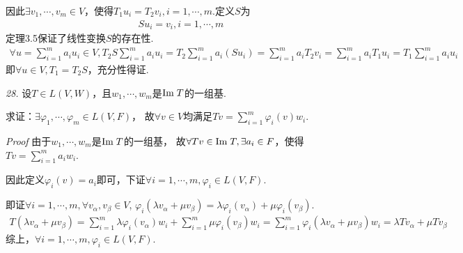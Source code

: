因此\(\exists v_1,\cdots,v_m \in V\)，使得\(T_1u_i=T_2v_i,i=1,\cdots,m\).定义\(S\)为
    \begin{align*}
        Su_i=v_i,i=1,\cdots,m
    \end{align*}
定理3.5保证了线性变换\(S\)的存在性.
    \begin{align*}
        \forall u=\sum_{i=1}^m a_iu_i \in V,T_2S\sum_{i=1}^m a_iu_i=T_2\sum_{i=1}^m a_i(Su_i)
        =\sum_{i=1}^m a_iT_2v_i=\sum_{i=1}^m a_iT_1u_i=T_1\sum_{i=1}^m a_iu_i
    \end{align*}
即\(\forall u \in V , T_1=T_2S\)，充分性得证.

\hspace*{\fill}

    \begin{comment}
        \textit{26.}
        设\(D \in L(P(R))\)对于其中任意的多项式\(p\)满足\(\mydeg Dp=\mydeg p-1\).

        求证：\(D\)是满射变换.

        \textit{Proof}
        根据\textit{3.B.10}，命题等价于
            \begin{align*}
                \myspan (D(x),D(x^2),\cdots)=\Img D=P(R)=\myspan (1,x,\cdots)
            \end{align*}
        根据\textit{2.C.10}，由于\(\mydeg Dp=\mydeg p-1\)，

        故\(\myspan (D(x),D(x^2),\cdots)=\myspan (1,x,\cdots)\)成立.
    \end{comment}

\textit{28.}
设\(T \in L(V,W)\)，且\(w_1,\cdots,w_m\)是\(\mathrm{Im \;} T\)的一组基.

求证：\(\exists \varphi_1,\cdots,\varphi_m \in L(V,F)\)，
故\(\forall v \in V\)均满足\(Tv=\sum_{i=1}^m{\varphi_i(v)w_i}\).

\textit{Proof}
由于\(w_1,\cdots,w_m\)是\(\mathrm{Im \;} T\)的一组基，
故\(\forall Tv \in \mathrm{Im \;} T,\exists a_i \in F\)，使得\(Tv=\sum_{i=1}^m a_iw_i\).

因此定义\(\varphi_i(v)=a_i\)即可，下证\(\forall i=1,\cdots,m,\varphi_i \in L(V,F)\).

即证\(\forall i=1,\cdots,m,\forall v_\alpha,v_\beta \in V\),
\(\varphi_i(\lambda v_\alpha+\mu v_\beta)=\lambda \varphi_i(v_\alpha)+\mu \varphi_i(v_\beta)\).
    \begin{align*}
        T(\lambda v_\alpha+\mu v_\beta)=\sum_{i=1}^m \lambda \varphi_i(v_\alpha)w_i+\sum_{i=1}^m \mu \varphi_i(v_\beta)w_i
        =\sum_{i=1}^m \varphi_i(\lambda v_\alpha+\mu v_\beta)w_i=\lambda Tv_\alpha+\mu Tv_\beta
    \end{align*}
综上，\(\forall i=1,\cdots,m,\varphi_i \in L(V,F)\).

